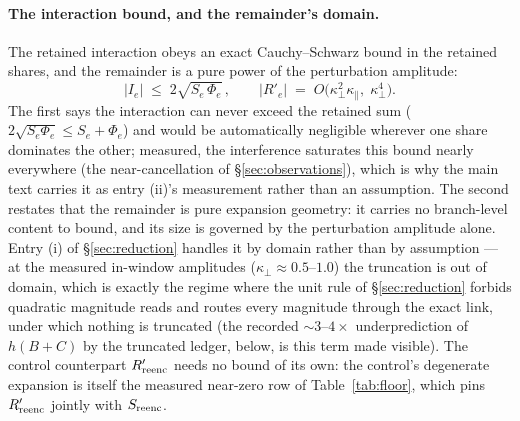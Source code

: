 \paragraph{The interaction bound, and the remainder's domain.} The
retained interaction obeys an exact Cauchy--Schwarz bound in the
retained shares, and the remainder is a pure power of the
perturbation amplitude:
\begin{equation}
|I_e| \;\le\; 2\sqrt{S_e\,\Phi_e}\,,
\qquad
\big|R'_e\big| \;=\;
O\big(\kappa_\perp^2\kappa_\parallel,\; \kappa_\perp^4\big).
\label{eq:dropbounds}
\end{equation}
The first says the interaction can never
exceed the retained sum ($2\sqrt{S_e\Phi_e} \le S_e + \Phi_e$) and
would be automatically negligible wherever one share dominates the
other; measured, the interference saturates this bound nearly
everywhere (the near-cancellation of \S\ref{sec:observations}), which
is why the main text carries it as entry (ii)'s measurement rather
than an assumption. The second restates that the remainder is pure
expansion geometry: it carries no branch-level content to bound, and
its size is governed by the perturbation amplitude alone. Entry (i)
of \S\ref{sec:reduction} handles it by domain rather than by
assumption --- at the measured in-window amplitudes
($\kappa_\perp \approx 0.5$--$1.0$) the truncation is out of domain,
which is exactly the regime where the unit rule of
\S\ref{sec:reduction} forbids quadratic magnitude reads and routes
every magnitude through the exact link, under which nothing is
truncated (the recorded ${\sim}3$--$4\times$ underprediction of
$h(B{+}C)$ by the truncated ledger, below, is this term made
visible). The
control counterpart $R'_{\mathrm{reenc}}$ needs no bound of its own: the
control's degenerate expansion is itself the measured near-zero row of
Table~\ref{tab:floor}, which pins $R'_{\mathrm{reenc}}$ jointly with
$S_{\mathrm{reenc}}$.

